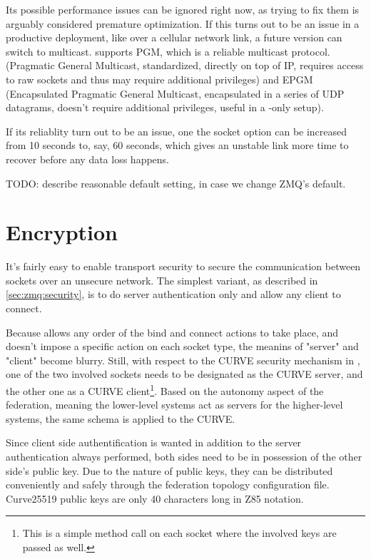 Its possible performance issues can be ignored right now, as trying to fix them
is arguably considered premature optimization. If this turns out to be an issue
in a productive deployment, like over a cellular network link, a future version
can switch to multicast. \zmq supports PGM, which is a reliable multicast
protocol. (Pragmatic General Multicast, standardized, directly on top of IP,
requires access to raw sockets and thus may require additional privileges) and
EPGM (Encapsulated Pragmatic General Multicast, encapsulated in a series of UDP
datagrams, doesn't require additional privileges, useful in a \zmq-only setup).

If its reliablity turn out to be an issue, one the socket option
 can be increased from 10 seconds to, say, 60 seconds, which
gives an unstable link more time to recover before any data loss happens.

TODO: describe reasonable default setting, in case we change ZMQ's default.


\section{Encryption}\label{sec:approach:encryption}
It's fairly easy to enable transport security to secure the communication
between \zmq sockets over an unsecure network.
The simplest variant, as described in
\autoref{sec:zmq:security}, is to do server authentication only and allow any client to connect.

Because \zmq allows any order of the bind and connect actions to take place,
and doesn't impose a specific action on each socket type, the meanins of
"server" and "client" become blurry. Still, with respect to the CURVE security
mechanism in \zmq, one of the two involved sockets needs to be designated as
the CURVE server, and the other one as a CURVE client\footnote{This is a simple method
call on each socket where the involved keys are passed as well.}. Based on the
autonomy aspect of the federation, meaning the lower-level systems act as
servers for the higher-level systems, the same schema is applied to the CURVE.

Since client side authentification is wanted in addition to the server
authentication always performed, both sides need to be in possession of the
other side's public key.  Due to the nature of public keys, they can be
distributed conveniently and safely through the federation topology
configuration file. Curve25519 public keys are only 40 characters long in
\gls{Z85} notation.

